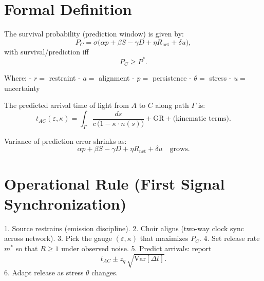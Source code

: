 \documentclass{article}
\begin{document}
\section*{Formal Definition}

The survival probability (prediction window) is given by:
\[
P_C = \sigma\big( \alpha p + \beta S - \gamma D + \eta R_{\text{net}} + \delta u \big),
\]
with survival/prediction iff
\[
P_C \geq P^*.
\]

Where:
- $r =$ restraint  
- $a =$ alignment  
- $p =$ persistence  
- $\theta =$ stress  
- $u =$ uncertainty  

The predicted arrival time of light from $A$ to $C$ along path $\Gamma$ is:
\[
t_{AC}(\varepsilon, \kappa) = \int_{\Gamma} \frac{ds}{c \,\big(1 - \kappa \cdot n(s)\big)} + \text{GR} + \text{(kinematic terms)}.
\]

Variance of prediction error shrinks as:
\[
\alpha p + \beta S - \gamma D + \eta R_{\text{net}} + \delta u \quad \text{grows.}
\]

\section*{Operational Rule (First Signal Synchronization)}

1. Source restrains (emission discipline).  
2. Choir aligns (two-way clock sync across network).  
3. Pick the gauge $(\varepsilon, \kappa)$ that maximizes $P_C$.  
4. Set release rate $m^*$ so that $R \geq 1$ under observed noise.  
5. Predict arrivals: report
\[
t_{AC} \pm z_q \, \sqrt{\mathrm{Var}[\Delta t]}.
\]
6. Adapt release as stress $\theta$ changes.  
\end{document}
